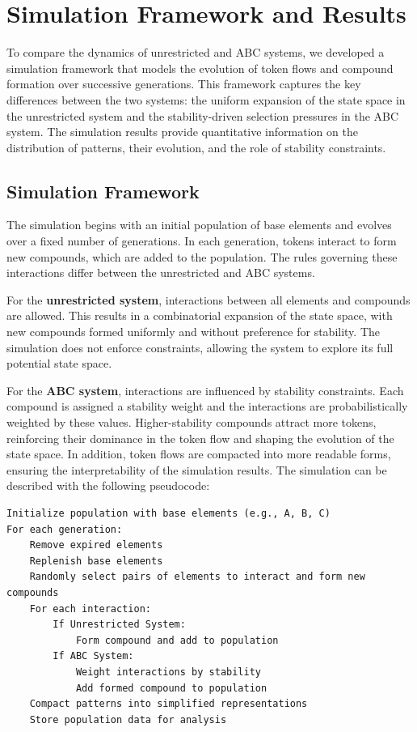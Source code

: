 \documentclass[entropy,article,submit,pdftex,oneauthor]{Definitions/mdpi}
\begin{document}
\section{Simulation Framework and Results}

To compare the dynamics of unrestricted and ABC systems, we developed a simulation framework that models the evolution of token flows and compound formation over successive generations. This framework captures the key differences between the two systems: the uniform expansion of the state space in the unrestricted system and the stability-driven selection pressures in the ABC system. The simulation results provide quantitative information on the distribution of patterns, their evolution, and the role of stability constraints.

\subsection{Simulation Framework}

The simulation begins with an initial population of base elements and evolves over a fixed number of generations. In each generation, tokens interact to form new compounds, which are added to the population. The rules governing these interactions differ between the unrestricted and ABC systems.

For the \textbf{unrestricted system}, interactions between all elements and compounds are allowed. This results in a combinatorial expansion of the state space, with new compounds formed uniformly and without preference for stability. The simulation does not enforce constraints, allowing the system to explore its full potential state space.

For the \textbf{ABC system}, interactions are influenced by stability constraints. Each compound is assigned a stability weight and the interactions are probabilistically weighted by these values. Higher-stability compounds attract more tokens, reinforcing their dominance in the token flow and shaping the evolution of the state space. In addition, token flows are compacted into more readable forms, ensuring the interpretability of the simulation results. The simulation can be described with the following pseudocode:

\scriptsize
\begin{center}
\begin{minipage}{0.7\textwidth}
\ttfamily
\begin{verbatim}
Initialize population with base elements (e.g., A, B, C)
For each generation:
    Remove expired elements
    Replenish base elements
    Randomly select pairs of elements to interact and form new compounds
    For each interaction:
        If Unrestricted System:
            Form compound and add to population
        If ABC System:
            Weight interactions by stability
            Add formed compound to population
    Compact patterns into simplified representations
    Store population data for analysis
\end{verbatim}
\end{minipage}
\end{center}
\normalsize
\end{document}
